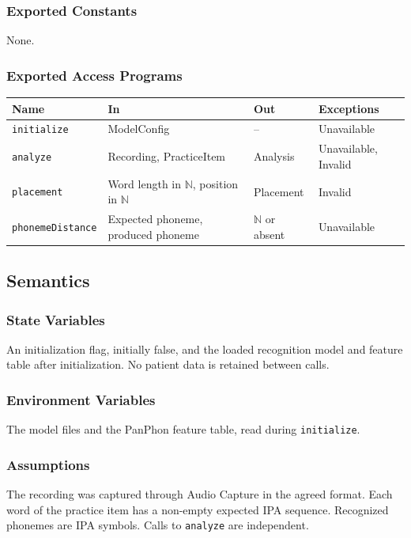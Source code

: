 \documentclass[12pt, titlepage]{article}
\begin{document}
\subsubsection{Exported Constants}
None.

\subsubsection{Exported Access Programs}
\noindent\begin{tabularx}{\textwidth}{@{}l X X l@{}}
\toprule
\textbf{Name} & \textbf{In} & \textbf{Out} & \textbf{Exceptions}\\
\midrule
\texttt{initialize} & ModelConfig & -- & Unavailable\\
\texttt{analyze} & Recording, PracticeItem & Analysis & Unavailable, Invalid\\
\texttt{placement} & Word length in $\mathbb{N}$, position in $\mathbb{N}$ &
Placement & Invalid\\
\texttt{phonemeDistance} & Expected phoneme, produced phoneme &
$\mathbb{N}$ or absent & Unavailable\\
\bottomrule
\end{tabularx}

\subsection{Semantics}

\subsubsection{State Variables}
An initialization flag, initially false, and the loaded recognition model and
feature table after initialization. No patient data is retained between calls.

\subsubsection{Environment Variables}
The model files and the PanPhon feature table, read during
\texttt{initialize}.

\subsubsection{Assumptions}
The recording was captured through Audio Capture in the agreed format. Each
word of the practice item has a non-empty expected IPA sequence. Recognized
phonemes are IPA symbols. Calls to \texttt{analyze} are independent.
\end{document}
